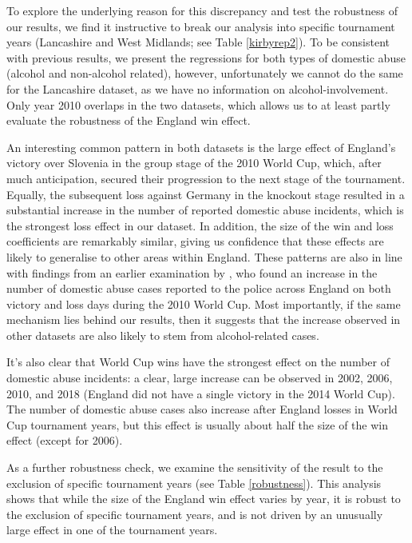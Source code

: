 \documentclass[12pt, a4paper]{article}
\begin{document}
To explore the underlying reason for this discrepancy and test the robustness of our results, we find it instructive to break our analysis into specific tournament years (Lancashire and West Midlands; see Table \ref{kirbyrep2}). To be consistent with previous results, we present the regressions for both types of domestic abuse (alcohol and non-alcohol related), however, unfortunately we cannot do the same for the Lancashire dataset, as we have no information on alcohol-involvement. Only year 2010 overlaps in the two datasets, which allows us to at least partly evaluate the robustness of the England win effect.

An interesting common pattern in both datasets is the large effect of England's victory over Slovenia in the group stage of the 2010 World Cup, which, after much anticipation, secured their progression to the next stage of the tournament. Equally, the subsequent loss against Germany in the knockout stage resulted in a substantial increase in the number of reported domestic abuse incidents, which is the strongest loss effect in our dataset. In addition, the size of the win and loss coefficients are remarkably similar, giving us confidence that these effects are likely to generalise to other areas within England. These patterns are also in line with findings from an earlier examination by \cite{Brimicombe2012}, who found an increase in the number of domestic abuse cases reported to the police across England on both victory and loss days during the 2010 World Cup.  Most importantly, if the same mechanism lies behind our results, then it suggests that the increase observed in other datasets are also likely to stem from alcohol-related cases. 
   
  It's also clear that World Cup wins have the strongest effect on the number of domestic abuse incidents: a clear, large increase can be observed in 2002, 2006, 2010, and 2018 (England did not have a single victory in the 2014 World Cup). The number of domestic abuse cases also increase after England losses in World Cup tournament years, but this effect is usually about half the size of the win effect (except for 2006).
  
  As a further robustness check, we examine the sensitivity of the result to the exclusion of specific tournament years  (see Table \ref{robustness}). This analysis shows that while the size of the England win effect varies by year, it is robust to the exclusion of specific tournament years, and is not driven by an unusually large effect in one of the tournament years.
\end{document}
